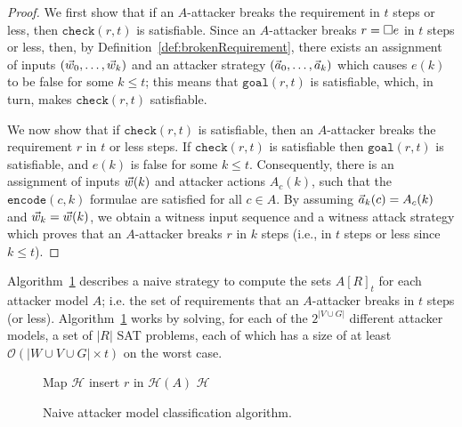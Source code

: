 \begin{proof}
We first show that if an $A$-attacker breaks the requirement in $t$ steps or less, then $\mathtt{check}(r,t)$ is satisfiable. Since an $A$-attacker breaks $r={{\square}} e$ in $t$ steps or less, then, by Definition~\ref{def:brokenRequirement}, there exists an assignment of inputs $(\vec{w}_0, \ldots, \vec{w}_k)$ and an attacker strategy $(\vec{a}_0, \ldots, \vec{a}_k)$ which causes $e(k)$ to be false for some $k\leq t$; this means that $\mathtt{goal}(r,t)$ is satisfiable, which, in turn, makes $\mathtt{check}(r,t)$ satisfiable.

We now show that if $\mathtt{check}(r,t)$ is satisfiable, then an $A$-attacker breaks the requirement $r$ in $t$ or less steps. If $\mathtt{check}(r,t)$ is satisfiable then $\mathtt{goal}(r,t)$ is satisfiable, and $e(k)$ is false for some $k\leq t$. Consequently, there is an assignment of inputs $\vec{w}(k)$ and attacker actions $A_c(k)$, such that the $\mathtt{encode}(c,k)$ formulae are satisfied for all $c\in A$. By assuming $\vec{a}_k(c)=A_c(k)$ and $\vec{w}_k =\vec{w}(k)$, we obtain a witness input sequence and a witness attack strategy which proves that an $A$-attacker breaks $r$ in $k$ steps (i.e., in $t$ steps or less since $k\leq t$).
\end{proof}

Algorithm~\ref{alg:BadQuantification} describes a naive strategy to compute the sets $A[R]_t$ for each attacker model $A$; i.e. the set of requirements that an $A$-attacker breaks in $t$ steps (or less). Algorithm~\ref{alg:BadQuantification} works by solving, for each of the $2^{|V \cup G|}$ different attacker models, a set of $|R|$ SAT problems, 
{
each of which has a size of at least $\mathcal{O}\left({|W\cup V\cup G|\times t}\right)$ on the worst case.}

\begin{figure}[!t]
\centering
{
\begin{algorithm}[H]
Map $\mathcal{H}$\;
{
	{
		{
			insert $r$ in $\mathcal{H}(A)$\;
		}
	 }
}
 \Return $\mathcal{H}$\;
 \caption{Naive attacker model classification algorithm.}
 \label{alg:BadQuantification}
\end{algorithm}
}
\end{figure}

